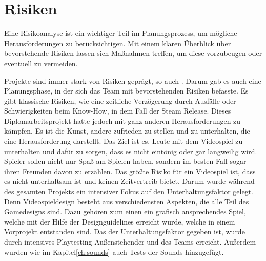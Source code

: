 
\section{Risiken}\label{sec:risiken}

\renewcommand{\kapitelautor}{Autor: Nils} %
%
Eine Risikoanalyse ist ein wichtiger Teil im Planungsprozess, um mögliche Herausforderungen zu berücksichtigen.
Mit einem klaren Überblick über bevorstehende Risiken lassen sich Maßnahmen treffen, um diese vorzubeugen oder eventuell zu vermeiden.\cite{AsanaRisiken}

Projekte sind immer stark von Risiken geprägt, so auch \ff. Darum gab es auch eine Planungsphase, in der sich das Team mit bevorstehenden Risiken befasste.
Es gibt klassische Risiken, wie eine zeitliche Verzögerung durch Ausfälle oder Schwierigkeiten beim Know-How, in dem Fall der Steam Release.
Dieses Diplomarbeitsprojekt hatte jedoch mit ganz anderen Herausforderungen zu kämpfen. Es ist die Kunst, andere zufrieden zu stellen und zu unterhalten, die eine Herausforderung darstellt.
Das Ziel ist es, Leute mit dem Videospiel zu unterhalten und dafür zu sorgen, dass es nicht eintönig oder gar langweilig wird.
Spieler sollen nicht nur Spaß am Spielen haben, sondern im besten Fall sogar ihren Freunden davon zu erzählen.
Das größte Risiko für ein Videospiel ist, dass es nicht unterhaltsam ist und keinen Zeitvertreib bietet. Darum wurde während des gesamten Projekts ein intensiver Fokus auf den Unterhaltungsfaktor gelegt.
Denn Videospieldesign besteht aus verschiedensten Aspekten, die alle Teil des Gamedesigns sind.
Dazu gehören zum einen ein grafisch ansprechendes Spiel, welche mit der Hilfe der Designguidelines erreicht wurde, welche in einem Vorprojekt entstanden sind.
Das der Unterhaltungsfaktor gegeben ist, wurde durch intensives Playtesting Außenstehender und des Teams erreicht.
Außerdem wurden wie im Kapitel\ref{ch:sounds} auch Tests der Sounds hinzugefügt.
%

\renewcommand{\kapitelautor}{}
